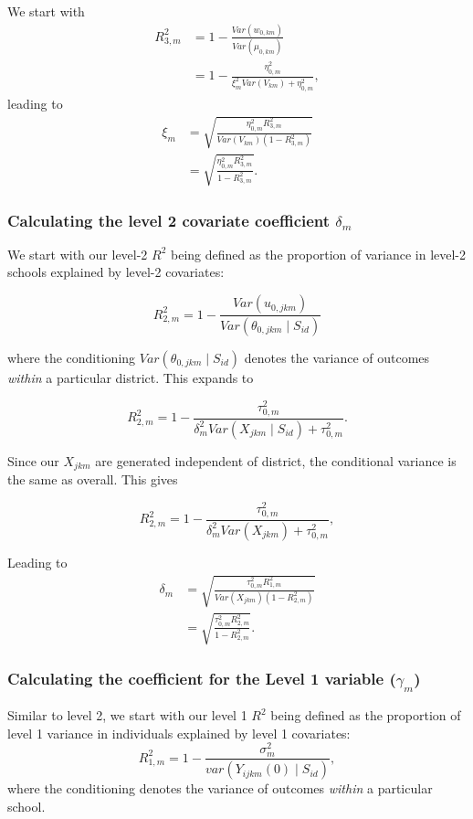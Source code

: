\documentclass[12pt]{article}
\begin{document}
We start with
\begin{align*}
R_{3,m}^2
&= 1 - \frac{Var(w_{0,km})}{Var(\mu_{0,km})} \\
&= 1 - \frac{\eta^2_{0,m}}{\xi_m^2 Var(V_{km}) + \eta^2_{0,m}},
\end{align*}
leading to
\begin{align*}
\xi_m  &= \sqrt{\frac{\eta^2_{0,m}R_{3,m}^2}{Var(V_{km})(1 - R_{3,m}^2)}} \\
&= \sqrt{\frac{\eta^2_{0,m}R_{3,m}^2}{1 - R_{3,m}^2}}.
\end{align*}


\subsubsection{Calculating the level 2 covariate coefficient $\delta_m$}

We start with our level-2 $R^2$ being defined as the proportion of variance in level-2 schools explained by level-2 covariates:

\[
R_{2,m}^2 = 1 - \frac{Var(u_{0,jkm})}{Var(\theta_{0,jkm} \mid S_{id})}
\]

where the conditioning $Var(\theta_{0,jkm} \mid S_{id})$ denotes the variance of outcomes \emph{within} a particular district.
This expands to

\[
R_{2,m}^2 = 1 - \frac{\tau^2_{0,m}}{\delta_m^2Var(X_{jkm} \mid S_{id}) + \tau^2_{0,m}}.
\]

Since our $X_{jkm}$ are generated independent of district, the conditional variance is the same as overall. This gives

\[
R_{2,m}^2 = 1 - \frac{\tau^2_{0,m}}{\delta_m^2Var(X_{jkm}) + \tau^2_{0,m}},
\]

Leading to
\begin{align*}
\delta_m  &= \sqrt{\frac{\tau^2_{0,m}R_{1,m}^2}{Var(X_{jkm})(1 - R_{2,m}^2)}} \\
&= \sqrt{\frac{\tau^2_{0,m}R_{2,m}^2}{1 - R_{2,m}^2}}.
\end{align*}

\subsubsection{Calculating the coefficient for the Level 1 variable ($\gamma_m$)}

Similar to level 2, we start with our level 1 $R^2$ being defined as the proportion of level 1 variance in individuals explained by level 1 covariates:
\[ R^2_{1,m} = 1 - \frac{ \sigma^2_m }{ var( Y_{ijkm}(0) \mid S_{id})},  \]
where the conditioning denotes the variance of outcomes \emph{within} a particular school.
\end{document}
